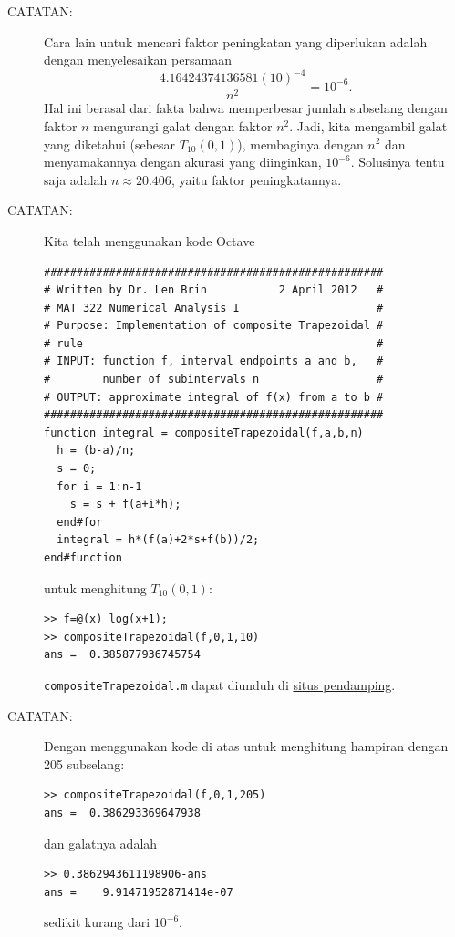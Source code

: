 \begin{description}
\begin{description}
\item [{CATATAN:}] Cara lain untuk mencari faktor peningkatan yang diperlukan
adalah dengan menyelesaikan persamaan 
\[
\frac{4.16424374136581(10)^{-4}}{n^{2}}=10^{-6}.
\]
Hal ini berasal dari fakta bahwa memperbesar jumlah subselang dengan
faktor $n$ mengurangi galat dengan faktor $n^{2}$. Jadi, kita mengambil
galat yang diketahui (sebesar $T_{10}(0,1)$), membaginya dengan $n^{2}$
dan menyamakannya dengan akurasi yang diinginkan, $10^{-6}$. Solusinya
tentu saja adalah $n\approx20.406$, yaitu faktor peningkatannya.
\item [{CATATAN:}] Kita telah menggunakan kode Octave\begin{verbatim}
####################################################
# Written by Dr. Len Brin           2 April 2012   #
# MAT 322 Numerical Analysis I                     #
# Purpose: Implementation of composite Trapezoidal #
# rule                                             #
# INPUT: function f, interval endpoints a and b,   #
#        number of subintervals n                  #
# OUTPUT: approximate integral of f(x) from a to b #
####################################################
function integral = compositeTrapezoidal(f,a,b,n)
  h = (b-a)/n;
  s = 0;
  for i = 1:n-1
    s = s + f(a+i*h);
  end#for
  integral = h*(f(a)+2*s+f(b))/2;
end#function
\end{verbatim}untuk menghitung $T_{10}(0,1)$:\begin{verbatim}
>> f=@(x) log(x+1);
>> compositeTrapezoidal(f,0,1,10)
ans =  0.385877936745754
\end{verbatim}\texttt{compositeTrapezoidal.m} dapat diunduh di \href{http://lqbrin.github.io/tea-time-numerical/ancillaries.html}{situs pendamping}.
\item [{CATATAN:}] Dengan menggunakan kode di atas untuk menghitung hampiran
dengan 205 subselang:\begin{verbatim}
>> compositeTrapezoidal(f,0,1,205)
ans =  0.386293369647938
\end{verbatim}dan galatnya adalah \begin{verbatim}
>> 0.3862943611198906-ans
ans =    9.91471952871414e-07
\end{verbatim}sedikit kurang dari $10^{-6}$.
\end{description}
\end{description}

